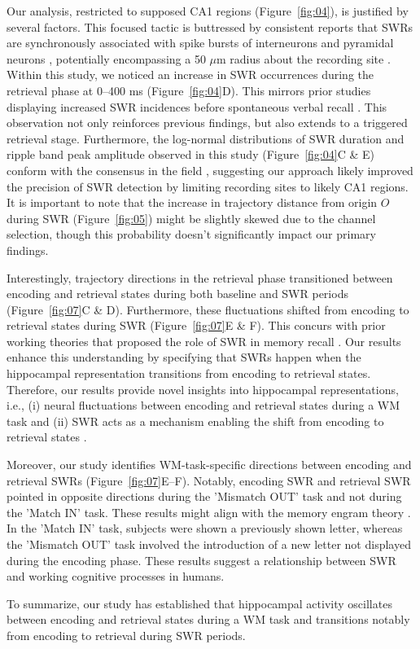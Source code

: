 Our analysis, restricted to supposed CA1 regions (Figure~\ref{fig:04}), is justified by several factors. This focused tactic is buttressed by consistent reports that SWRs are synchronously associated with spike bursts of interneurons and pyramidal neurons \cite{buzsaki_two-stage_1989,quyen_cell_2008,royer_control_2012,hajos_input-output_2013}, potentially encompassing a 50 $\mu$m radius about the recording site \cite{schomburg_spiking_2012}. Within this study, we noticed an increase in SWR occurrences during the retrieval phase at 0--400 ms (Figure~\ref{fig:04}D). This mirrors prior studies displaying increased SWR incidences before spontaneous verbal recall \cite{norman_hippocampal_2019, norman_hippocampal_2021}. This observation not only reinforces previous findings, but also extends to a triggered retrieval stage. Furthermore, the log-normal distributions of SWR duration and ripple band peak amplitude observed in this study (Figure~\ref{fig:04}C \& E) conform with the consensus in the field \cite{liu_consensus_2022}, suggesting our approach likely improved the precision of SWR detection by limiting recording sites to likely CA1 regions. It is important to note that the increase in trajectory distance from origin $O$ during SWR (Figure~\ref{fig:05}) might be slightly skewed due to the channel selection, though this probability doesn't significantly impact our primary findings.

Interestingly, trajectory directions in the retrieval phase transitioned between encoding and retrieval states during both baseline and SWR periods (Figure~\ref{fig:07}C \& D). Furthermore, these fluctuations shifted from encoding to retrieval states during SWR (Figure~\ref{fig:07}E \& F). This concurs with prior working theories that proposed the role of SWR in memory recall \cite{norman_hippocampal_2019, norman_hippocampal_2021}. Our results enhance this understanding by specifying that SWRs happen when the hippocampal representation transitions from encoding to retrieval states. Therefore, our results provide novel insights into hippocampal representations, i.e., (i) neural fluctuations between encoding and retrieval states during a WM task and (ii) SWR acts as a mechanism enabling the shift from encoding to retrieval states \cite{buzsaki_hippocampal_2015}.

Moreover, our study identifies WM-task-specific directions between encoding and retrieval SWRs (Figure~\ref{fig:07}E--F). Notably, encoding SWR and retrieval SWR pointed in opposite directions during the 'Mismatch OUT' task and not during the 'Match IN' task. These results might align with the memory engram theory \cite{liu_optogenetic_2012}. In the 'Match IN' task, subjects were shown a previously shown letter, whereas the 'Mismatch OUT' task involved the introduction of a new letter not displayed during the encoding phase. These results suggest a relationship between SWR and working cognitive processes in humans.

To summarize, our study has established that hippocampal activity oscillates between encoding and retrieval states during a WM task and transitions notably from encoding to retrieval during SWR periods.

\label{sec:discussion}